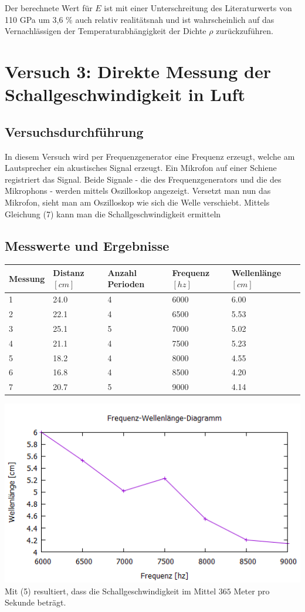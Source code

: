 \documentclass{scrartcl}
\begin{document}
Der berechnete Wert für $E$ ist mit einer Unterschreitung des Literaturwerts von 110 GPa um 3,6 \% auch relativ realitätsnah und ist wahrscheinlich auf das Vernachlässigen der Temperaturabhängigkeit der Dichte $\rho$ zurückzuführen.


\section{Versuch 3: Direkte Messung der Schallgeschwindigkeit in Luft}
\subsection{Versuchsdurchführung}
In diesem Versuch wird per Frequenzgenerator eine Frequenz erzeugt, welche am Lautsprecher ein akustisches Signal erzeugt. Ein Mikrofon auf einer Schiene registriert das Signal. Beide Signale - die des Frequenzgenerators und die des Mikrophons - werden mittels Oszilloskop angezeigt. 
Versetzt man nun das Mikrofon, sieht man am Oszilloskop wie sich die Welle verschiebt.
Mittels Gleichung (7) kann man die Schallgeschwindigkeit ermitteln
\subsection{Messwerte und Ergebnisse}
\begin{table}[h]
\begin{tabular}{l|l|l|l|l}
Messung & Distanz $[cm]$ & Anzahl Perioden & Frequenz $[hz]$ & Wellenlänge $[cm]$ \\ \hline
1       & 24.0          & 4 & 6000 & 6.00\\
2       & 22.1          & 4 & 6500 & 5.53\\
3       & 25.1          & 5 & 7000 & 5.02\\
4       & 21.1          & 4 & 7500 & 5.23\\
5       & 18.2          & 4 & 8000 & 4.55\\
6       & 16.8          & 4 & 8500 & 4.20\\
7       & 20.7          & 5 & 9000 & 4.14\\
\end{tabular}
\end{table}
\includegraphics[width=1\textwidth]{Versuch3_dia.png}
Mit (5) resultiert, dass die Schallgeschwindigkeit im Mittel $365$ Meter pro Sekunde beträgt.
\end{document}
